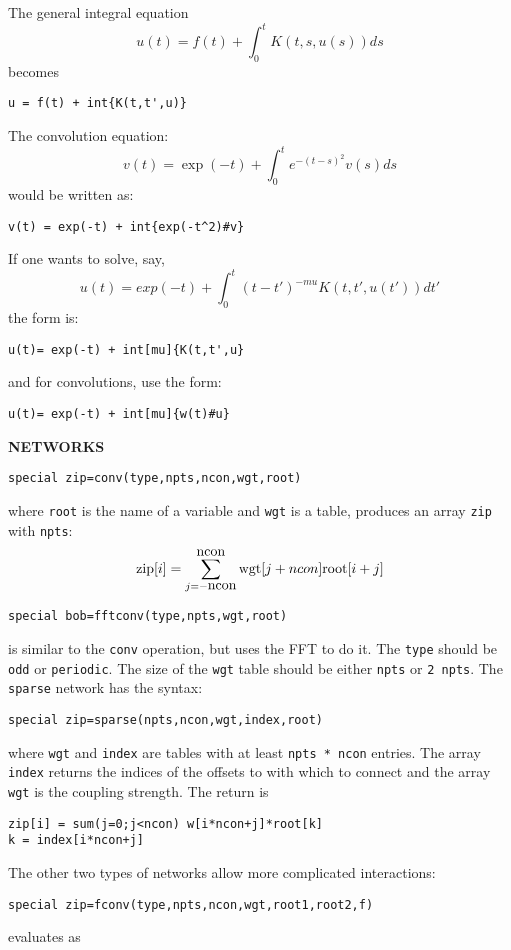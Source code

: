 \medskip

 
The general integral equation
\[
	u(t)=f(t)+\int_0^t K(t,s,u(s))ds
\]
becomes
\begin{verbatim}
u = f(t) + int{K(t,t',u)}
\end{verbatim}
The convolution equation:
\[
 v(t) = \exp(-t) + \int_0^t e^{-(t-s)^2}v(s) ds
\]
would be written as:
\begin{verbatim}
v(t) = exp(-t) + int{exp(-t^2)#v}
\end{verbatim}
If one wants to solve, say,
\[
 u(t) = exp(-t) + \int^t_0 (t-t')^{-mu} K(t,t',u(t'))dt'
\]
the form is:
\begin{verbatim}
u(t)= exp(-t) + int[mu]{K(t,t',u}
\end{verbatim}
and for convolutions, use the form:
\begin{verbatim}
u(t)= exp(-t) + int[mu]{w(t)#u}
\end{verbatim}
\noindent
{\bf NETWORKS}
\begin{verbatim}
special zip=conv(type,npts,ncon,wgt,root)
\end{verbatim}
where {\tt root} is the name of a variable and {\tt wgt} is a table,
produces an array {\tt zip} with {\tt npts}:
\[
\hbox{zip}[i] =\sum_{j=-\hbox{ncon}}^{\hbox{ncon}}\hbox{wgt}[j+ncon]
\hbox{root}[i+j] 
\]
\begin{verbatim}
special bob=fftconv(type,npts,wgt,root)
\end{verbatim}
is similar to the {\tt conv} operation, but uses the FFT to do it. The {\tt type} should be {\tt odd} or {\tt periodic}. The size of the {\tt wgt} table should be either {\tt npts} or {\tt 2 npts}.
The {\tt sparse} network has the syntax:
\begin{verbatim}
special zip=sparse(npts,ncon,wgt,index,root)
\end{verbatim}
where {\tt wgt} and {\tt index} are tables with at least {\tt npts *
ncon} entries.   The array {\tt index} returns the indices of the
offsets to with which to connect and the array {\tt wgt} is the
coupling strength. The return is
\begin{verbatim}
zip[i] = sum(j=0;j<ncon) w[i*ncon+j]*root[k]
k = index[i*ncon+j] 
\end{verbatim}
The other two types of networks allow more complicated interactions:
\begin{verbatim}
special zip=fconv(type,npts,ncon,wgt,root1,root2,f)
\end{verbatim}
evaluates as 

